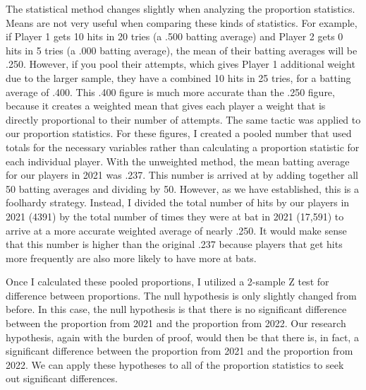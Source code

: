 \documentclass[10pt]{article}
\begin{document}
The statistical method changes slightly when analyzing the proportion statistics. Means are not very useful when comparing 
these kinds of statistics. For example, if Player 1 gets 10 hits in 20 tries (a .500 batting average) and Player 2 gets 0 hits 
in 5 tries (a .000 batting average), the mean of their batting averages will be .250. However, if you pool their attempts, 
which gives Player 1 additional weight due to the larger sample, they have a combined 10 hits in 25 tries, for a batting 
average of .400. This .400 figure is much more accurate than the .250 figure, because it creates a weighted mean that gives 
each player a weight that is directly proportional to their number of attempts. The same tactic was applied to our proportion 
statistics. For these figures, I created a pooled number that used totals for the necessary variables rather than calculating 
a proportion statistic for each individual player. With the unweighted method, the mean batting average for our players in 2021 
was .237. This number is arrived at by adding together all 50 batting averages and dividing by 50. However, as we have 
established, this is a foolhardy strategy. Instead, I divided the total number of hits by our players in 2021 (4391) by the 
total number of times they were at bat in 2021 (17,591) to arrive at a more accurate weighted average of nearly .250. It would 
make sense that this number is higher than the original .237 because players that get hits more frequently are also more likely 
to have more at bats. 

Once I calculated these pooled proportions, I utilized a 2-sample Z test for difference between proportions. The null 
hypothesis is only slightly changed from before. In this case, the null hypothesis is that there is no significant difference 
between the proportion from 2021 and the proportion from 2022. Our research hypothesis, again with the burden of proof, would 
then be that there is, in fact, a significant difference between the proportion from 2021 and the proportion from 2022. We can 
apply these hypotheses to all of the proportion statistics to seek out significant differences.
\end{document}
